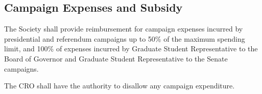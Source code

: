 \subsection{Campaign Expenses and Subsidy}

\begin{longenum}[ label*=\thesubsection.\arabic*., align=left]
	\item The Society shall provide reimbursement for campaign expenses incurred by
presidential and referendum campaigns up to 50\% of the maximum spending limit, and 100\% of expenses incurred by Graduate Student Representative to the Board of Governor and Graduate Student Representative to the Senate campaigns.
    \item The CRO shall have the authority to disallow any campaign expenditure. 
\end{longenum}